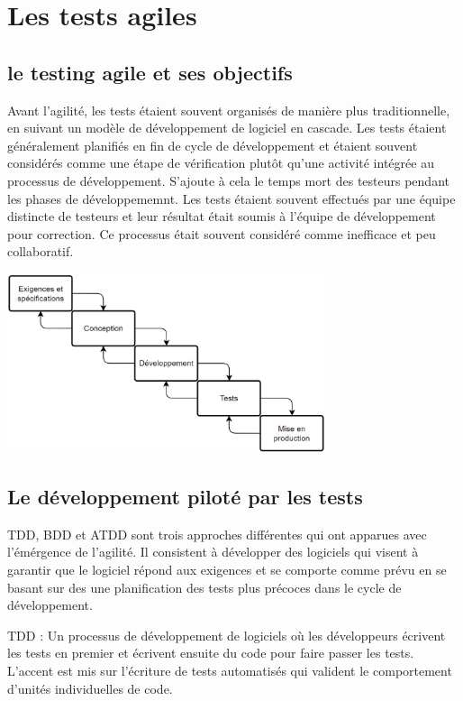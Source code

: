\chapter{Les tests agiles}
\thispagestyle{fancy}
\section{ le testing agile et ses objectifs}
\label{sec:agiletest}
Avant l'agilité, les tests étaient souvent organisés de manière plus traditionnelle, en suivant un modèle de développement de logiciel en cascade. Les tests étaient généralement planifiés en fin de cycle de développement et étaient souvent considérés comme une étape de vérification plutôt qu'une activité intégrée au processus de développement. S'ajoute à cela le temps mort des testeurs pendant les phases de développememnt. Les tests étaient souvent effectués par une équipe distincte de testeurs et leur résultat était soumis à l'équipe de développement pour correction. Ce processus était souvent considéré comme inefficace et peu collaboratif.
\begin{center}
    \includegraphics[width=0.7\textwidth]{incremental.png}

    
\end{center}

\section{Le développement piloté par les tests}

TDD, BDD et ATDD sont trois approches différentes qui ont  apparues avec l'émérgence de l'agilité. Il consistent à développer des logiciels qui visent à garantir que le logiciel répond aux exigences et se comporte comme prévu en se basant sur des une planification des tests plus précoces dans le cycle de développement.

TDD : Un processus de développement de logiciels où les développeurs écrivent les tests en premier et écrivent ensuite du code pour faire passer les tests. L'accent est mis sur l'écriture de tests automatisés qui valident le comportement d'unités individuelles de code.

